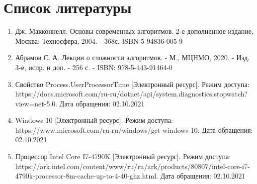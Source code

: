 \documentclass[12pt]{report}
\begin{document}
\chapter*{Список литературы}
\begin{enumerate}
	\item Дж. Макконнелл. Основы современных алгоритмов. 2-е дополненное издание, Москва: Техносфера, 2004. - 368с. ISBN 5-94836-005-9

	\item Абрамов С. А. Лекции о сложности алгоритмов. - М., МЦНМО, 2020. - Изд. 3-е, испр. и доп. - 256 с. - ISBN: 978-5-443-91464-0
	\item Свойство Process.UserProcessorTime [Электронный ресурс]. Режим доступа: https://docs.microsoft.com/ru-ru/dotnet/api/system.diagnostics.stopwatch?view=net-5.0. Дата обращения: 02.10.2021
	\item Windows 10 [Электронный ресурс]. Режим доступа: https://www.microsoft.com/ru-ru/windows/get-windows-10. Дата обращения: 02.10.2021
	\item Процессор Intel Core I7-4790K [Электронный ресурс]. Режим доступа: https://ark.intel.com/content/www/ru/ru/ark/products/80807/intel-core-i7-4790k-processor-8m-cache-up-to-4-40-ghz.html. Дата обращения: 02.10.2021
\end{enumerate}
\end{document}
